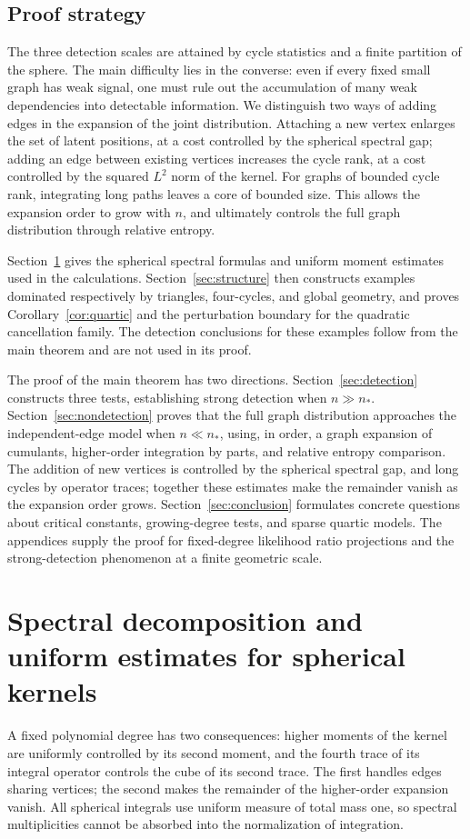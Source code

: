 \documentclass[11pt,reqno]{amsart}
\numberwithin{equation}{section}
\theoremstyle{definition}
\theoremstyle{remark}
\theoremstyle{definition}
\begin{document}
\subsection{Proof strategy}
The three detection scales are attained by cycle statistics and a finite partition of the sphere.
The main difficulty lies in the converse: even if every fixed small graph has weak signal,
one must rule out the accumulation of many weak dependencies into detectable information.
We distinguish two ways of adding edges in the expansion of the joint distribution.
Attaching a new vertex enlarges the set of latent positions, at a cost controlled by the spherical spectral gap;
adding an edge between existing vertices increases the cycle rank, at a cost controlled by the squared $L^2$ norm of the kernel.
For graphs of bounded cycle rank, integrating long paths leaves a core of bounded size.
This allows the expansion order to grow with $n$, and ultimately controls the full graph distribution through relative entropy.

Section~\ref{sec:prelim} gives the spherical spectral formulas and uniform moment estimates used in the calculations.
Section~\ref{sec:structure} then constructs examples dominated respectively by triangles, four-cycles, and global geometry,
and proves Corollary~\ref{cor:quartic} and the perturbation boundary for the quadratic cancellation family.
The detection conclusions for these examples follow from the main theorem and are not used in its proof.

The proof of the main theorem has two directions.
Section~\ref{sec:detection} constructs three tests, establishing strong detection when $n\gg n_*$.
Section~\ref{sec:nondetection} proves that the full graph distribution approaches the independent-edge model when $n\ll n_*$,
using, in order, a graph expansion of cumulants, higher-order integration by parts, and relative entropy comparison.
The addition of new vertices is controlled by the spherical spectral gap, and long cycles by operator traces;
together these estimates make the remainder vanish as the expansion order grows.
Section~\ref{sec:conclusion} formulates concrete questions about critical constants, growing-degree tests, and sparse quartic models.
The appendices supply the proof for fixed-degree likelihood ratio projections and the strong-detection phenomenon at a finite geometric scale.

\section{Spectral decomposition and uniform estimates for spherical kernels}\label{sec:prelim}
A fixed polynomial degree has two consequences: higher moments of the kernel are uniformly controlled by its second moment,
and the fourth trace of its integral operator controls the cube of its second trace.
The first handles edges sharing vertices; the second makes the remainder of the higher-order expansion vanish.
All spherical integrals use uniform measure of total mass one, so spectral multiplicities cannot be absorbed into the normalization of integration.
\end{document}
